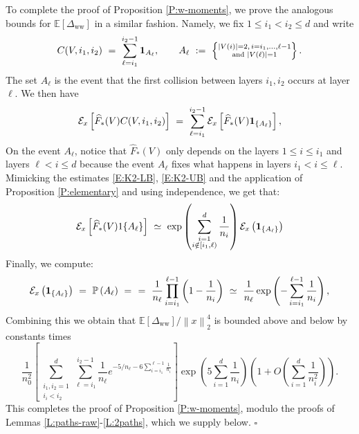 \documentclass[11pt, reqno]{amsart}
\newcommand{\E}[1]{{\mathbb E}\left [#1\right]}
\renewcommand{\P}{{\mathbb P}}
\newcommand{\gives}{\ensuremath{\rightarrow}}
\newcommand{\abs}[1]{\ensuremath{\left| #1 \right|}}
\newcommand{\lr}[1]{\ensuremath{\left(#1 \right)}}
\newcommand{\norm}[1]{\left\lVert#1\right\rVert}
\newcommand{\set}[1]{\ensuremath{\{#1\}}}
\newcommand{\Dww}{\Delta_{\mathrm{ww}}}
\begin{document}
 To complete the proof of Proposition \ref{P:w-moments}, we prove the analogous bounds for $\E{\Dww}$ in a similar fashion. Namely, we fix $1\leq i_1<i_2\leq d$ and write
\[C(V,i_1,i_2)~=~\sum_{\ell=i_1}^{i_2-1} {\bf 1}_{A_\ell},\qquad A_\ell~:=~\left\{\substack{\abs{V(i)}=2,\, i=i_1,\ldots, \ell-1\\ \text{and }\abs{V(\ell)}=1}\right\}.\]
The set $A_{\ell}$ is the event that the first collision between layers $i_1,i_2$ occurs at layer $\ell.$ We then have
\[\mathcal E_x\left[\widehat{F}_{\ast}(V)C(V,i_1,i_2)\right]~=~\sum_{\ell=i_1}^{i_2-1}\mathcal E_x\left[\widehat{F}_{\ast}(V) {\bf 1}_{ \{A_\ell\}}\right],\]
On the event $A_\ell$, notice that $\widehat{F}_{\ast}(V)$ only depends on the layers $1\leq i \leq i_1$ and layers $\ell < i \leq d$ because the event $A_\ell$ fixes what happens in layers $i_1 < i \leq \ell$. Mimicking the estimates \eqref{E:K2-LB}, \eqref{E:K2-UB} and the application of Proposition \ref{P:elementary} and using independence, we get that:
\[\mathcal E_x\left[\widehat{F}_{\ast}(V) 1 \{A_\ell\}\right] ~\simeq~ \exp\lr{\sum_{\substack {i=1 \\ i \notin [i_1,\ell) }}^{d} \frac{1}{n_i}} \mathcal E_x\lr{ {\bf 1}_{\{ A_\ell\}}}\]
Finally, we compute:
\[\mathcal E_x\lr{ {\bf 1}_{\set{ A_\ell}}}~=~\P\lr{A_\ell}~=~ ~=~\frac{1}{n_\ell}\prod_{i=i_1}^{\ell-1}\lr{1-\frac{1}{n_i}}~\simeq~\frac{1}{n_\ell}\exp\lr{-\sum_{i=i_1}^{\ell-1}\frac{1}{n_i}},\]
Combining this we  obtain that  $\E{\Dww} / \norm{x}_2^4$ is bounded above and below by constants times
\[\frac{1}{n_0^2}\left[\sum_{\substack{i_1,i_2=1\\i_i<i_2}}^d \sum_{\ell=i_1}^{i_2-1} \frac{1}{n_\ell} e^{-5/n_\ell -6\sum_{i=i_1}^{\ell-1}\frac{1}{n_i}}\right]\exp\lr{5\sum_{i=1}^d\frac{1}{n_i}}\lr{1+O\lr{\sum_{i=1}^d \frac{1}{n_i^2}}}.\]
This completes the proof of Proposition \ref{P:w-moments}, modulo the proofs of Lemmas \ref{L:paths-raw}-\ref{L:2paths}, which we supply below. \hfill $\square$
\end{document}
